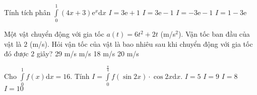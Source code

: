\begin{ex}%
	Tính tích phân $\displaystyle \int \limits_{0}^{1} (4x+3) \mathrm{e}^x \mathrm{d} x$
	\choice
	{\True $I = 3\mathrm{e}+1$}
	{$I = 3\mathrm{e}-1$}
	{$I = -3\mathrm{e}-1$}
	{$I = 1-3\mathrm{e}$}
\end{ex}

\begin{ex}%
	Một vật chuyển động với gia tốc $a(t)=6t^2 +2t $ (m/s$^2$). Vận tốc ban đầu của vật là $2$ (m/s). Hỏi vận tốc của vật là bao nhiêu sau khi chuyển động với gia tốc đó được $2$ giây?
	\choice
	{ 29 m/s}
	{ m/s}
	{ 18 m/s}
	{ 20 m/s}
\end{ex}

\begin{ex}%
	Cho $\displaystyle \int \limits_0^1 f(x) \mathrm{d} x =16$. Tính $I=\displaystyle \int \limits_0^{\tfrac{\pi}{4}} f(\sin 2x)\cdot \cos 2x \mathrm{d} x$.
	\choice
	{ $I=5$}
	{ $I=9$}
	{\True $I=8$}
	{ $I=10$}
\end{ex}

